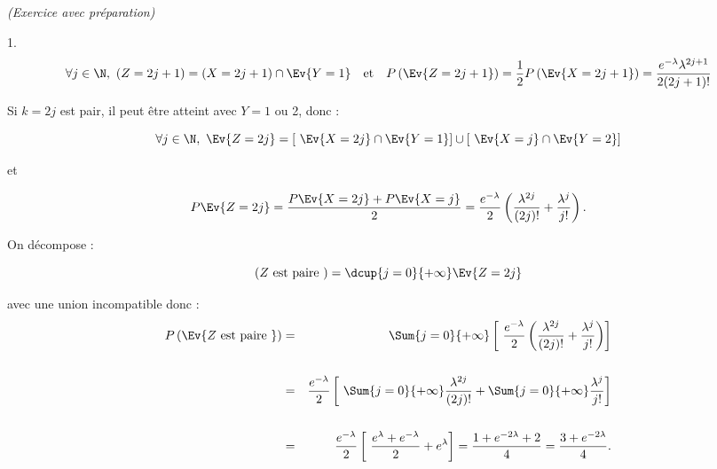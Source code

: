 \documentclass[11pt]{article}%
\begin{document}
\begin{exercice}{\it (Exercice avec préparation)}
\begin{noliste}{1.}
\[
 \forall j \in \N, \ ( Z = 2 j + 1 ) = (X = 2 j + 1 ) \cap \Ev{Y = 1 }
\ \ \text{ et } \ \ P \left(\Ev{ Z = 2 j + 1 }\right) = \frac{ 1 }{ 2 }
P \left(\Ev{ X = 2 j + 1 }\right) = \frac{ e^{ - \lambda } \lambda^{ 2j
+ 1 } }{ 2 (2j + 1)! } 
\]

 Si $k = 2j$ est pair, il peut être atteint avec $Y = 1$ ou 2, donc : 
 
\[
 \forall j \in \N, \ \Ev{ Z = 2 j } = [ \ \Ev{ X = 2j } \cap \Ev{ Y = 1
} ] \cup [ \ \Ev{ X = j } \cap \Ev{ Y = 2 } ] 
\]

 et
 
\[
 P \Ev{ Z = 2j } = \frac{ P \Ev{ X = 2j } + P \Ev{ X = j } }{ 2 } =
\frac{ e^{ - \lambda } }{ 2 } \left( \frac{ \lambda^{ 2j } }{ (2j)! } +
\frac{ \lambda^{j} }{ j! } \right). 
\]

 \item On décompose : 
 
\[
 (Z \text{ est paire } ) = \dcup{j = 0}{+ \infty} \Ev{Z = 2j } 
\]

 avec une union incompatible donc : 
 \begin{eqnarray*}
 P \left(\Ev{ Z \text{ est paire } }\right) & = & \Sum{j = 0}{+ \infty}
\left[ \ \frac{ e^{ - \lambda } }{ 2 } \left( \frac{ \lambda^{ 2j } }{
(2j)! } + \frac{ \lambda^{j} }{ j! } \right) \right] \\
\\
 & = & \frac{ e^{ - \lambda } }{ 2 } \left[ \ \Sum{j = 0}{+ \infty}
\frac{ \lambda^{ 2j } }{ (2j)! } + \Sum{j = 0}{+ \infty} \frac{
\lambda^{j} }{ j! } \right] \\
\\
 & = & \frac{ e^{ - \lambda } }{ 2 } \left[ \ \frac{ e^{ \lambda } +
e^{ - \lambda } }{ 2 } + e^{ \lambda } \right] = \frac{ 1 + e^{ - 2
\lambda } + 2 }{ 4 } = \frac{ 3 + e^{ - 2 \lambda } }{ 4 }. 
 \end{eqnarray*}

 \end{noliste}
 \end{exercice}

 \newpage
 
 
\end{document}
